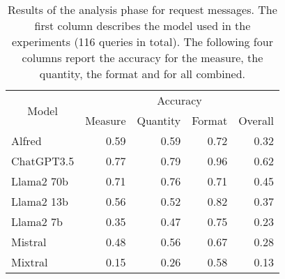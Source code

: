 \begin{table}[ht]
\centering


\begin{tabular}{|l|rrrr|}
\hline
\multicolumn{1}{|c|}{\multirow{2}{*}{Model}} & \multicolumn{4}{c|}{Accuracy} \\ \cline{2-5} 
\multicolumn{1}{|c|}{} & \multicolumn{1}{l|}{Measure} & \multicolumn{1}{l|}{Quantity} & \multicolumn{1}{l|}{Format} & \multicolumn{1}{l|}{Overall} \\ \hline
\rowcolor[HTML]{EFEFEF}
Alfred & \multicolumn{1}{r|}{0.59} & \multicolumn{1}{r|}{0.59} & \multicolumn{1}{r|}{0.72} & 0.32 \\ \hline
ChatGPT3.5 & \multicolumn{1}{r|}{0.77} & \multicolumn{1}{r|}{0.79} & \multicolumn{1}{r|}{0.96} & 0.62 \\ \hline
\rowcolor[HTML]{EFEFEF}
Llama2 70b & \multicolumn{1}{r|}{0.71} & \multicolumn{1}{r|}{0.76} & \multicolumn{1}{r|}{0.71} & 0.45 \\ \hline
Llama2 13b & \multicolumn{1}{r|}{0.56} & \multicolumn{1}{r|}{0.52} & \multicolumn{1}{r|}{0.82} & 0.37 \\ \hline
\rowcolor[HTML]{EFEFEF}
Llama2 7b & \multicolumn{1}{r|}{0.35} & \multicolumn{1}{r|}{0.47} & \multicolumn{1}{r|}{0.75} & 0.23 \\ \hline
Mistral & \multicolumn{1}{r|}{0.48} & \multicolumn{1}{r|}{0.56} & \multicolumn{1}{r|}{0.67} & 0.28 \\ \hline
\rowcolor[HTML]{EFEFEF}
Mixtral & \multicolumn{1}{r|}{0.15} & \multicolumn{1}{r|}{0.26} & \multicolumn{1}{r|}{0.58} & 0.13 \\ \hline
\end{tabular}

\caption{
    Results of the analysis phase for request messages.
    The first column describes the model used in the experiments (116 queries in total).
    The following four columns report the accuracy for the measure, the quantity, the format and for all combined.
}
\label{tab:req}
\end{table}